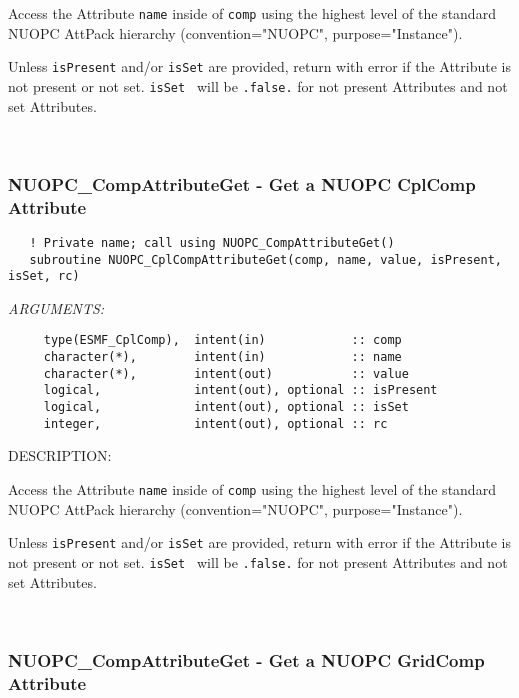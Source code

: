      Access the Attribute {\tt name} inside of {\tt comp} using the highest level
     of the standard NUOPC AttPack hierarchy (convention="NUOPC", 
     purpose="Instance").
  
     Unless {\tt isPresent} and/or {\tt isSet} are provided, return with error
     if the Attribute is not present or not set. {\tt isSet } will be 
     {\tt .false.} for not present Attributes and not set Attributes. 
 
\mbox{}\hrulefill\ 
 
\subsubsection [NUOPC\_CompAttributeGet] {NUOPC\_CompAttributeGet - Get a NUOPC CplComp Attribute}


\begin{verbatim}   ! Private name; call using NUOPC_CompAttributeGet() 
   subroutine NUOPC_CplCompAttributeGet(comp, name, value, isPresent, isSet, rc)\end{verbatim}{\em ARGUMENTS:}
\begin{verbatim}     type(ESMF_CplComp),  intent(in)            :: comp
     character(*),        intent(in)            :: name
     character(*),        intent(out)           :: value
     logical,             intent(out), optional :: isPresent
     logical,             intent(out), optional :: isSet
     integer,             intent(out), optional :: rc\end{verbatim}
{\sf DESCRIPTION:\\ }


     Access the Attribute {\tt name} inside of {\tt comp} using the highest level
     of the standard NUOPC AttPack hierarchy (convention="NUOPC", 
     purpose="Instance").
  
     Unless {\tt isPresent} and/or {\tt isSet} are provided, return with error
     if the Attribute is not present or not set. {\tt isSet } will be 
     {\tt .false.} for not present Attributes and not set Attributes. 
 
\mbox{}\hrulefill\ 
 
\subsubsection [NUOPC\_CompAttributeGet] {NUOPC\_CompAttributeGet - Get a NUOPC GridComp Attribute}


